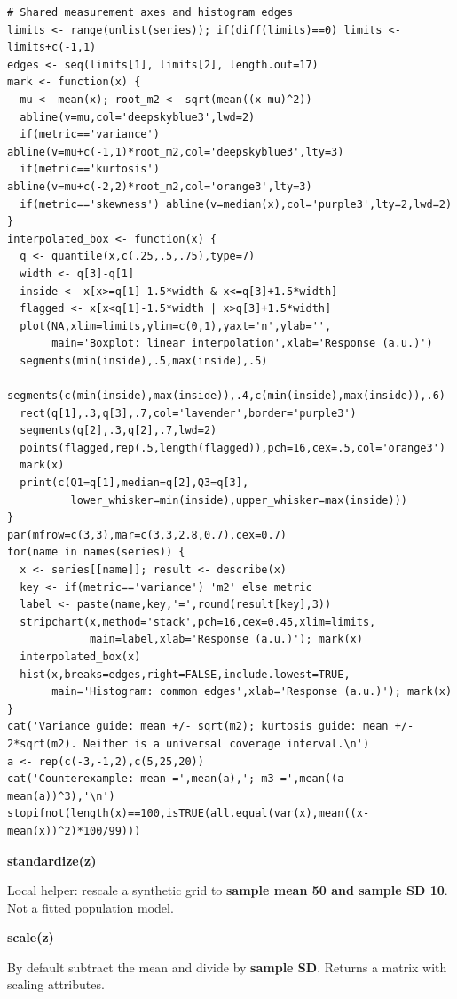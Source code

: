 \documentclass[11pt,a4paper]{article}
\begin{document}
\begin{Verbatim}[fontsize=\footnotesize,breaklines=true,breakanywhere=true]
# Shared measurement axes and histogram edges
limits <- range(unlist(series)); if(diff(limits)==0) limits <- limits+c(-1,1)
edges <- seq(limits[1], limits[2], length.out=17)
mark <- function(x) {
  mu <- mean(x); root_m2 <- sqrt(mean((x-mu)^2))
  abline(v=mu,col='deepskyblue3',lwd=2)
  if(metric=='variance') abline(v=mu+c(-1,1)*root_m2,col='deepskyblue3',lty=3)
  if(metric=='kurtosis') abline(v=mu+c(-2,2)*root_m2,col='orange3',lty=3)
  if(metric=='skewness') abline(v=median(x),col='purple3',lty=2,lwd=2)
}
interpolated_box <- function(x) {
  q <- quantile(x,c(.25,.5,.75),type=7)
  width <- q[3]-q[1]
  inside <- x[x>=q[1]-1.5*width & x<=q[3]+1.5*width]
  flagged <- x[x<q[1]-1.5*width | x>q[3]+1.5*width]
  plot(NA,xlim=limits,ylim=c(0,1),yaxt='n',ylab='',
       main='Boxplot: linear interpolation',xlab='Response (a.u.)')
  segments(min(inside),.5,max(inside),.5)
  segments(c(min(inside),max(inside)),.4,c(min(inside),max(inside)),.6)
  rect(q[1],.3,q[3],.7,col='lavender',border='purple3')
  segments(q[2],.3,q[2],.7,lwd=2)
  points(flagged,rep(.5,length(flagged)),pch=16,cex=.5,col='orange3')
  mark(x)
  print(c(Q1=q[1],median=q[2],Q3=q[3],
          lower_whisker=min(inside),upper_whisker=max(inside)))
}
par(mfrow=c(3,3),mar=c(3,3,2.8,0.7),cex=0.7)
for(name in names(series)) {
  x <- series[[name]]; result <- describe(x)
  key <- if(metric=='variance') 'm2' else metric
  label <- paste(name,key,'=',round(result[key],3))
  stripchart(x,method='stack',pch=16,cex=0.45,xlim=limits,
             main=label,xlab='Response (a.u.)'); mark(x)
  interpolated_box(x)
  hist(x,breaks=edges,right=FALSE,include.lowest=TRUE,
       main='Histogram: common edges',xlab='Response (a.u.)'); mark(x)
}
cat('Variance guide: mean +/- sqrt(m2); kurtosis guide: mean +/- 2*sqrt(m2). Neither is a universal coverage interval.\n')
a <- rep(c(-3,-1,2),c(5,25,20))
cat('Counterexample: mean =',mean(a),'; m3 =',mean((a-mean(a))^3),'\n')
stopifnot(length(x)==100,isTRUE(all.equal(var(x),mean((x-mean(x))^2)*100/99)))

\end{Verbatim}

\par\noindent\textbf{standardize(z)}

Local helper: rescale a synthetic grid to \textbf{sample mean 50 and sample SD 10}. Not a fitted population model.

\par\noindent\textbf{scale(z)}

By default subtract the mean and divide by \textbf{sample SD}. Returns a matrix with scaling attributes.
\end{document}
